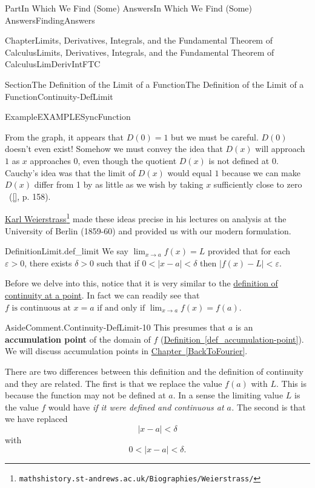\documentclass[oneside,10pt,]{book}
\newcommand{\xreffont}{\relax}
\newcommand{\terminology}[1]{\textbf{#1}}
\numberwithin{equation}{part}
\newcommand{\abs}[1]{\left|#1\right|}
\def\limit#1#2#3{{\displaystyle\lim_{#1\rightarrow #2}#3}}
\newcommand{\eps}{\varepsilon}
\newcommand{\lt}{<}
\begin{document}
\begin{partptx}{Part}{In Which We Find (Some) Answers}{}{In Which We Find (Some) Answers}{}{}{FindingAnswers}
\begin{chapterptx}{Chapter}{Limits, Derivatives, Integrals, and the Fundamental Theorem of Calculus}{}{Limits, Derivatives, Integrals, and the Fundamental Theorem of Calculus}{}{}{LimDerivIntFTC}
\begin{sectionptx}{Section}{The Definition of the Limit of a Function}{}{The Definition of the Limit of a Function}{}{}{Continuity-DefLimit}
\begin{example}{Example}{}{EXAMPLESyncFunction}
\begin{image}{0.22}{0.56}{0.22}{}
\end{image}%
From the graph, it appears that \(D(0) =1\) but we must be careful.  \(D(0)\) doesn't even exist!  Somehow we must convey the idea that \(D(x)\) will approach \(1\) as \(x\) approaches \(0\), even though the quotient \(D(x)\) is not defined at \(0\). Cauchy's idea was that the limit of \(D(x)\) would equal \(1\) because we can make \(D(x)\) differ from 1 by as little as we wish by taking \(x\) sufficiently close to zero ~(\hyperlink{jahnke03__histor_analy}{[{\xreffont 6}]}, p. 158).%
\end{example}
 \href{https://mathshistory.st-andrews.ac.uk/Biographies/Weierstrass/}{Karl Weierstrass}\footnote{\nolinkurl{mathshistory.st-andrews.ac.uk/Biographies/Weierstrass/}\label{Continuity-DefLimit-7-3}} made these ideas precise in his lectures on analysis at the University of Berlin (1859-60) and provided us with our modern formulation.%
\begin{definition}{Definition}{Limit.}{def_limit}%
%
We say \(\limit{x}{a}{f(x)} =L\) provided that for each \(\eps>0\), there exists \(\delta>0\) such that if \(0\lt \abs{x-a}\lt \delta\) then \(\abs{f(x)-L}\lt
\eps\).%
\end{definition}
Before we delve into this, notice that it is very similar to the  \hyperref[def_continuity]{definition of continuity at a point}.   In fact we can readily see that \(f
\text{ is continuous at } x=a \text{ if and only if }
\limit{x}{a}{f(x)} = f(a)\).%
\begin{aside}{Aside}{Comment.}{Continuity-DefLimit-10}%
This presumes that \(a\) is an \terminology{accumulation point} of the domain of \(f\) (\hyperref[def_accumulation-point]{Definition~{\xreffont\ref{def_accumulation-point}}}).  We will discuss accumulation points in \hyperref[BackToFourier]{Chapter~{\xreffont\ref{BackToFourier}}}.%
\end{aside}
There are two differences between this definition and the definition of continuity and they are related.  The first is that we replace the value \(f(a)\) with \(L\).  This is because the function may not be defined at \(a\).  In a sense the limiting value \(L\) is the value \(f\) would have \emph{if it were defined and continuous at \(a\).} The second is that we have replaced%
\begin{equation*}
\abs{x-a}\lt \delta
\end{equation*}
with%
\begin{equation*}
0\lt \abs{x-a}\lt \delta \text{.}
\end{equation*}

\end{sectionptx}
\end{chapterptx}
\end{partptx}
\end{document}

